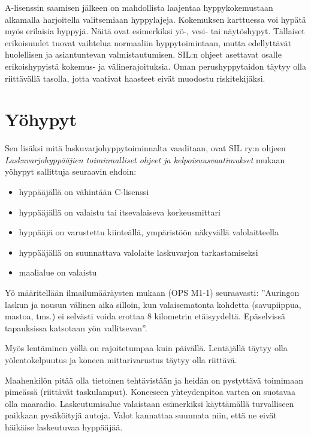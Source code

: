 
A-lisenssin saamisen jälkeen on mahdollista laajentaa hyppykokemustaan alkamalla harjoitella valitsemiaan hyppylajeja. Kokemuksen karttuessa voi hypätä myös erilaisia hyppyjä. Näitä ovat esimerkiksi yö\mbox{-,} vesi- tai näytöshypyt. Tällaiset erikoisuudet tuovat vaihtelua normaaliin hyppytoimintaan, mutta edellyttävät huolellisen ja asiantuntevan valmistautumisen. SIL:n ohjeet asettavat osalle erikoishypyistä kokemus- ja välinerajoituksia. Oman perushyppytaidon täytyy olla riittävällä tasolla, jotta vaativat haasteet eivät muodostu riskitekijäksi.  

\section{ Yöhypyt }
\label{erikoishypyt-yohypyt}


Sen lisäksi mitä laskuvarjohyppytoiminnalta vaaditaan, ovat SIL ry:n ohjeen \textit{Laskuvarjohyppääjien toiminnalliset ohjeet ja kelpoisuusvaatimukset} mukaan yöhypyt sallittuja seuraavin ehdoin: 

\begin{itemize}
\item  hyppääjällä on vähintään C-lisenssi  
\item  hyppääjällä on valaistu tai itsevalaiseva korkeusmittari 
\item  hyppääjä on varustettu kiinteällä, ympäristöön näkyvällä valolaitteella 
\item  hyppääjällä on suunnattava valolaite laskuvarjon tarkastamiseksi 
\item  maalialue on valaistu 
\end{itemize}

Yö määritellään ilmailumääräysten mukaan (OPS M1-1) seuraavasti: ''Auringon laskun ja nousun välinen aika silloin, kun valaisematonta kohdetta (savupiippua, mastoa, tms.) ei selvästi voida erottaa 8 kilometrin etäisyydeltä. Epäselvissä tapauksissa katsotaan yön vallitsevan''. 


Myös lentäminen yöllä on rajoitetumpaa kuin päivällä. Lentäjällä täytyy olla yölentokelpuutus ja koneen mittarivarustus täytyy olla riittävä. 


Maahenkilön pitää olla tietoinen tehtävistään ja heidän on pystyttävä toimimaan pimeässä (riittävät taskulamput). Koneeseen yhteydenpitoa varten on suotavaa olla maaradio. Laskeutumisalue valaistaan esimerkiksi käyttämällä turvalliseen paikkaan pysäköityjä autoja. Valot kannattaa suunnata niin, että ne eivät häikäise laskeutuvaa hyppääjää.  


